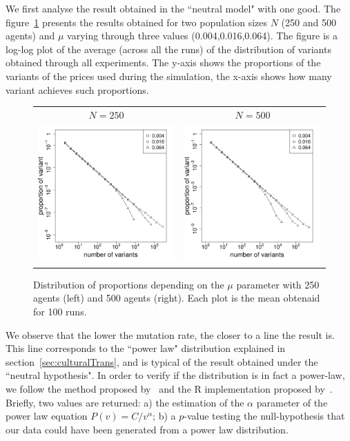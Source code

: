 \documentclass{wscpaperproc}
\begin{document}
We first analyse the result obtained in the ``neutral model" with one good. The figure~\ref{fig:allMutation} presents the results obtained for two population sizes $N$	 (250 and 500 agents) and $\mu$ varying through three values (0.004,0.016,0.064). The figure is a log-log plot of the average (across all the runs) of the distribution of variants obtained through all experiments. The y-axis shows the proportions of the variants of the prices used during the simulation, the x-axis shows how many variant achieves such proportions.

\begin{figure}[!h]
	\centering
	\begin{tabular}{ c c}
		 $N=250$ & $N=500$ \\
		\includegraphics[width=6cm]{img/allmuRandMaxN250.pdf}&
		\includegraphics[width=6cm]{img/allmuRandMaxN500.pdf}
	\end{tabular}
	\caption{Distribution of proportions depending on the $\mu$ parameter with 250 agents (left) and 500 agents (right). Each plot is the mean obtenaid for 100 runs.\label{fig:allMutation}}
\end{figure}

We observe that the lower the mutation rate, the closer to a line the result is. This line corresponds to the ``power law" distribution explained in section~\ref{sec:culturalTrans}, and is typical of the result obtained under the ``neutral hypothesis". In order to verify if the distribution is in fact a power-law, we follow the method proposed by~\cite{clauset2009powerlawdistributionsinempiricaldat} and the R implementation proposed by~\cite{gillespie_fitting_2015}. Briefly, two values are returned: a) the estimation of the $\alpha$ parameter of the power law equation $P(v)=C/v^\alpha $; b) a $p$-value testing the null-hypothesis that our data could have been generated from a power law distribution.
\end{document}
